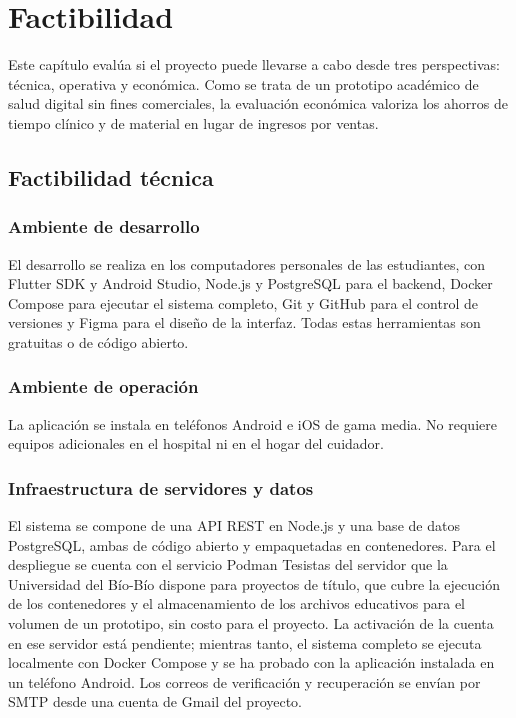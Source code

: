 \chapter[Factibilidad]{Factibilidad}

Este capítulo evalúa si el proyecto puede llevarse a cabo desde tres
perspectivas: técnica, operativa y económica. Como se trata de un prototipo
académico de salud digital sin fines comerciales, la evaluación económica
valoriza los ahorros de tiempo clínico y de material en lugar de ingresos por
ventas.

\section[Técnica]{Factibilidad técnica}

\subsection{Ambiente de desarrollo}

El desarrollo se realiza en los computadores personales de las estudiantes, con
Flutter SDK y Android Studio, Node.js y PostgreSQL para el backend, Docker
Compose para ejecutar el sistema completo, Git y GitHub para el control de
versiones y Figma para el diseño de la interfaz. Todas estas herramientas son
gratuitas o de código abierto.

\subsection{Ambiente de operación}

La aplicación se instala en teléfonos Android e iOS de gama media. No requiere
equipos adicionales en el hospital ni en el hogar del cuidador.

\subsection{Infraestructura de servidores y datos}

El sistema se compone de una API REST en Node.js y una base de datos PostgreSQL,
ambas de código abierto y empaquetadas en contenedores. Para el despliegue se
cuenta con el servicio Podman Tesistas del servidor que la Universidad del
Bío-Bío dispone para proyectos de título, que cubre la ejecución de los
contenedores y el almacenamiento de los archivos educativos para el volumen de
un prototipo, sin costo para el proyecto. La activación de la cuenta en ese
servidor está pendiente; mientras tanto, el sistema completo se ejecuta
localmente con Docker Compose y se ha probado con la aplicación instalada en un
teléfono Android. Los correos de verificación y recuperación se envían por SMTP
desde una cuenta de Gmail del proyecto.

